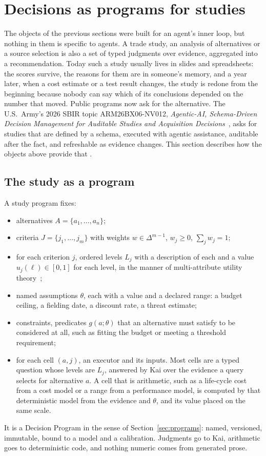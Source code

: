 \section{Decisions as programs for studies}
\label{sec:studies}

The objects of the previous sections were built for an agent's inner loop, but
nothing in them is specific to agents. A trade study, an analysis of
alternatives or a source selection is also a set of typed judgments over
evidence, aggregated into a recommendation. Today such a study usually lives in
slides and spreadsheets: the scores survive, the reasons for them are in
someone's memory, and a year later, when a cost estimate or a test result
changes, the study is redone from the beginning because nobody can say which
of its conclusions depended on the number that moved. Public programs now ask
for the alternative. The U.S.\ Army's 2026 SBIR topic ARM26BX06-NV012,
\emph{Agentic-AI, Schema-Driven Decision Management for Auditable Studies and
Acquisition Decisions}~\cite{armysbir}, asks for studies that are defined by a
schema, executed with agentic assistance, auditable after the fact, and
refreshable as evidence changes. This section describes how the objects above
provide that \proposed.

\subsection{The study as a program}

A study program fixes:
\begin{itemize}[leftmargin=1.5em]
  \item alternatives $A = \{a_1, \dots, a_n\}$;
  \item criteria $J = \{j_1, \dots, j_m\}$ with weights
    $w \in \Delta^{m-1}$, $w_j \ge 0$, $\sum_j w_j = 1$;
  \item for each criterion $j$, ordered levels $L_j$ with a description of
    each and a value $u_j(\ell) \in [0, 1]$ for each level, in the manner of
    multi-attribute utility theory~\cite{keeney1976};
  \item named assumptions $\theta$, each with a value and a declared range: a
    budget ceiling, a fielding date, a discount rate, a threat estimate;
  \item constraints, predicates $g(a; \theta)$ that an alternative must
    satisfy to be considered at all, such as fitting the budget or meeting a
    threshold requirement;
  \item for each cell $(a, j)$, an executor and its inputs. Most cells are a
    typed  question whose levels are $L_j$, answered by Kai over the
    evidence a query selects for alternative $a$. A cell that is arithmetic,
    such as a life-cycle cost from a cost model or a range from a performance
    model, is computed by that deterministic model from the evidence and
    $\theta$, and its value placed on the same scale.
\end{itemize}
It is a Decision Program in the sense of Section~\ref{sec:programs}: named,
versioned, immutable, bound to a model and a calibration. Judgments go to Kai,
arithmetic goes to deterministic code, and nothing numeric comes from
generated prose.

